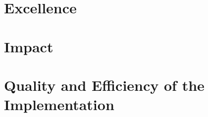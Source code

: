 \documentclass[a4paper,11pt]{article}
\begin{document}

\section{Excellence}
\vspace{-6pt}






\section{Impact}
\label{sec:impact}






\section{Quality and Efficiency of the Implementation}
\label{sec:implementation}






\label{sec:textend}
\end{document}
